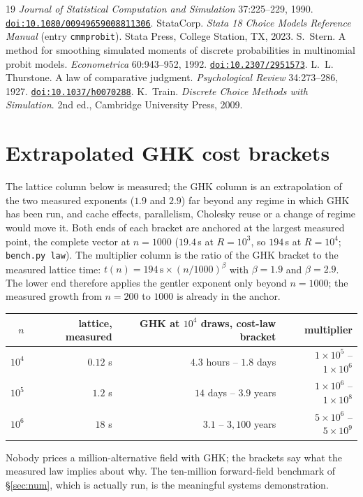 \documentclass[11pt]{article}
\begin{document}
\begin{thebibliography}{19}
\emph{Journal of Statistical Computation and Simulation} 37:225--229, 1990.
\href{https://doi.org/10.1080/00949659008811306}{\nolinkurl{doi:10.1080/00949659008811306}}.
 StataCorp.
\emph{Stata 18 Choice Models Reference Manual} (entry
\texttt{cmmprobit}). Stata Press, College Station, TX, 2023.
 S.~Stern.
A method for smoothing simulated moments of discrete probabilities in
multinomial probit models. \emph{Econometrica} 60:943--952, 1992.
\href{https://doi.org/10.2307/2951573}{\nolinkurl{doi:10.2307/2951573}}.
 L.~L. Thurstone.
A law of comparative judgment. \emph{Psychological Review} 34:273--286, 1927.
\href{https://doi.org/10.1037/h0070288}{\nolinkurl{doi:10.1037/h0070288}}.
 K.~Train.
\emph{Discrete Choice Methods with Simulation}. 2nd ed., Cambridge University Press, 2009.
\end{thebibliography}
\appendix
\section{Extrapolated GHK cost brackets}\label{app:extrap}

The lattice column below is measured; the GHK column is an
extrapolation of the two measured exponents ($1.9$ and $2.9$) far
beyond any regime in which GHK has been run, and cache effects,
parallelism, Cholesky reuse or a change of regime would move it. Both
ends of each bracket are anchored at the largest measured point, the
complete vector at $n=1000$ ($19.4$\,s at $R=10^3$, so $194$\,s at
$R=10^4$; \texttt{bench.py law}). The multiplier column is the ratio of
the GHK bracket to the measured lattice time:
$t(n)=194\,\mathrm{s}\times(n/1000)^{\beta}$ with $\beta=1.9$ and
$\beta=2.9$. The lower end therefore applies the gentler exponent only
beyond $n=1000$; the measured growth from $n=200$ to $1000$ is already in
the anchor.

\begin{center}\small
\begin{tabular}{rrrr}
\toprule
$n$ & lattice, measured & GHK at $10^4$ draws, cost-law bracket & multiplier \\
\midrule
$10^4$ & $0.12$ s & $4.3$ hours -- $1.8$ days & $1\times10^{5}$ -- $1\times10^{6}$ \\
$10^5$ & $1.2$ s & $14$ days -- $3.9$ years & $1\times10^{6}$ -- $1\times10^{8}$ \\
$10^6$ & $18$ s & $3.1$ -- $3{,}100$ years & $5\times10^{6}$ -- $5\times10^{9}$ \\
\bottomrule
\end{tabular}
\end{center}

Nobody prices a million-alternative field with GHK; the brackets say
what the measured law implies about why. The ten-million forward-field
benchmark of \S\ref{sec:num}, which is actually run, is the meaningful
systems demonstration.
\end{document}
